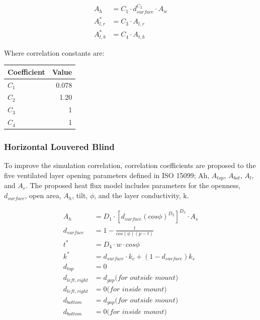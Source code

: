 \begin{equation}
\begin{array}{rl}
A_h & = C_1 \cdot d_{surface}^{C_2} \cdot A_w \\
A_{l,r}^* & = C_3 \cdot A_{l,r} \\
A_{t,b}^* & = C_4 \cdot A_{t,b}
\end{array}
\label{eq:ScreenCorrelations}
\end{equation}

Where correlation constants are:

\begin{tabular}{ l  r }
	\hline	
	Coefficient & Value \\
	\hline
	\hline
	$C_1$ & 0.078 \\
	$C_2$ & 1.20 \\
	$C_3$ & 1 \\
	$C_4$ & 1 \\
	\hline  
	
\end{tabular}

\subsubsection{Horizontal Louvered Blind}
To improve the simulation correlation, correlation coefficients are proposed to the five ventilated layer opening parameters defined in ISO 15099; Ah, $A_{top}$, $A_{bot}$, $A_l$, and $A_r$. The proposed heat flux model includes parameters for the openness, $d_{surface}$, open area, $A_h$, tilt, $\phi$, and the layer conductivity, k.

\begin{equation}
\begin{array}{rl}
A_h & = D_1 \cdot [d_{surface} (cos\phi)^{D_2}]^{D_3} \cdot A_s \\
d_{surface} & = 1 - \frac{t}{cos(\phi)(p-t)} \\
t^* & = D_4 \cdot w \cdot cos\phi \\
k^* & = d_{surface} \cdot k_c + (1 - d_{surface})k_s \\
d_{top} & = 0 \\
d_{left, right} & = d_{gap} \textit{(for outside mount)} \\
d_{left, right} & = 0 \textit{(for inside mount)} \\
d_{bottom} & = d_{gap} \textit{(for outside mount)} \\
d_{bottom} & = 0 \textit{(for inside mount)} \\
\end{array}
\label{eq:VenetianCorrelations}
\end{equation}

